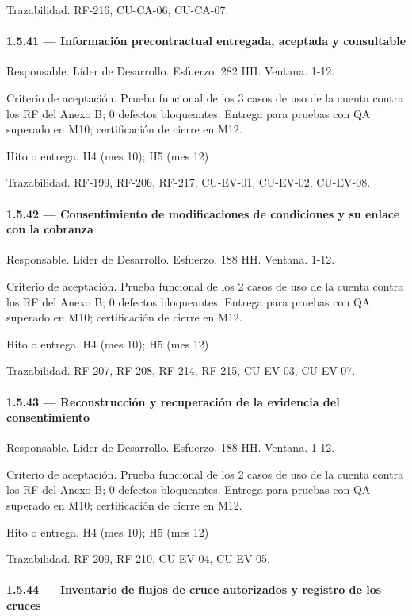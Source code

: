 \documentclass[11pt]{article}
\begin{document}
Trazabilidad. RF-216, CU-CA-06, CU-CA-07.

\paragraph{1.5.41 — Información precontractual entregada, aceptada y consultable}

Responsable. Líder de Desarrollo. Esfuerzo. 282 HH. Ventana. 1-12.

Criterio de aceptación. Prueba funcional de los 3 casos de uso de la cuenta contra los RF del Anexo B; 0 defectos bloqueantes. Entrega para pruebas con QA superado en M10; certificación de cierre en M12.

Hito o entrega. H4 (mes 10); H5 (mes 12)

Trazabilidad. RF-199, RF-206, RF-217, CU-EV-01, CU-EV-02, CU-EV-08.

\paragraph{1.5.42 — Consentimiento de modificaciones de condiciones y su enlace con la cobranza}

Responsable. Líder de Desarrollo. Esfuerzo. 188 HH. Ventana. 1-12.

Criterio de aceptación. Prueba funcional de los 2 casos de uso de la cuenta contra los RF del Anexo B; 0 defectos bloqueantes. Entrega para pruebas con QA superado en M10; certificación de cierre en M12.

Hito o entrega. H4 (mes 10); H5 (mes 12)

Trazabilidad. RF-207, RF-208, RF-214, RF-215, CU-EV-03, CU-EV-07.

\paragraph{1.5.43 — Reconstrucción y recuperación de la evidencia del consentimiento}

Responsable. Líder de Desarrollo. Esfuerzo. 188 HH. Ventana. 1-12.

Criterio de aceptación. Prueba funcional de los 2 casos de uso de la cuenta contra los RF del Anexo B; 0 defectos bloqueantes. Entrega para pruebas con QA superado en M10; certificación de cierre en M12.

Hito o entrega. H4 (mes 10); H5 (mes 12)

Trazabilidad. RF-209, RF-210, CU-EV-04, CU-EV-05.

\paragraph{1.5.44 — Inventario de flujos de cruce autorizados y registro de los cruces}
\end{document}
